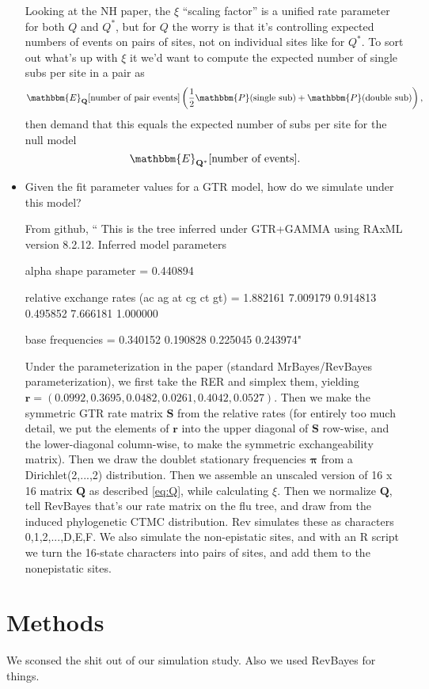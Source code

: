 \documentclass[11pt]{article}
\begin{document}
\begin{itemize}
Looking at the NH paper, the $\xi$ ``scaling factor'' is a unified rate parameter for both $Q$ and $Q^*$, but for $Q$ the worry is that it's controlling expected numbers of events on pairs of sites, not on individual sites like for $Q^*$.
To sort out what's up with $\xi$ it we'd want to compute the expected number of single subs per site in a pair as
\[
\mathbbm{E}_\mathbf{Q}[\text{number of pair events}]\left(\frac{1}{2}\mathbbm{P}(\text{single sub})+\mathbbm{P}(\text{double sub})\right),
\]
then demand that this equals the expected number of subs per site for the null model
\[
\mathbbm{E}_\mathbf{Q^*}[\text{number of events}].
\]


\item Given the fit parameter values for a GTR model, how do we simulate under this model?

From github, ``
This is the tree inferred under GTR+GAMMA using RAxML version 8.2.12.
Inferred model parameters

alpha shape parameter = 0.440894

relative exchange rates (ac ag at cg ct gt) = 1.882161 7.009179 0.914813 0.495852 7.666181 1.000000

base frequencies = 0.340152 0.190828 0.225045 0.243974"

Under the parameterization in the paper (standard MrBayes/RevBayes parameterization), we first take the RER and simplex them, yielding $\boldsymbol{r} = (0.0992,0.3695,0.0482,0.0261,0.4042,0.0527)$.
Then we make the symmetric GTR rate matrix $\boldsymbol{S}$ from the relative rates (for entirely too much detail, we put the elements of $\boldsymbol{r}$ into the upper diagonal of $\boldsymbol{S}$ row-wise, and the lower-diagonal column-wise, to make the symmetric exchangeability matrix).
Then we draw the doublet stationary frequencies $\boldsymbol{\pi}$ from a Dirichlet(2,...,2) distribution.
Then we assemble an unscaled version of 16 x 16 matrix $\boldsymbol{Q}$ as described \ref{eq:Q}, while calculating $\xi$.
Then we normalize $\boldsymbol{Q}$, tell RevBayes that's our rate matrix on the flu tree, and draw from the induced phylogenetic CTMC distribution.
Rev simulates these as characters 0,1,2,...,D,E,F.
We also simulate the non-epistatic sites, and with an R script we turn the 16-state characters into pairs of sites, and add them to the nonepistatic sites.

\end{itemize}


\section*{Methods}
We sconsed the shit out of our simulation study. Also we used RevBayes for things.
\end{document}
